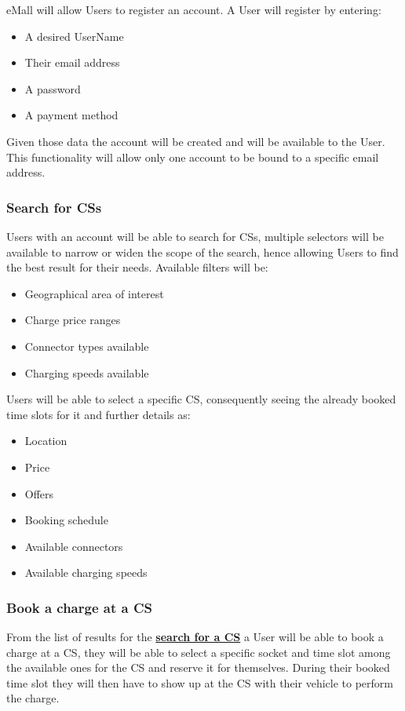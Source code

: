 \documentclass[11pt]{article}
\begin{document}
eMall will allow Users to register an account. A User will register by entering:
\begin{itemize}
    \item A desired UserName
    \item Their email address
    \item A password
    \item A payment method
\end{itemize}
Given those data the account will be created and will be available to the User. This functionality will allow only one account to be bound to a specific email address.

\subsubsection{Search for CSs}
\label{subsubsection:searchForCS}

Users with an account will be able to search for CSs, multiple selectors will be available to narrow or widen the scope of the search, hence allowing Users to find the best result for their needs. Available filters will be:
\begin{itemize}
    \item Geographical area of interest
    \item Charge price ranges
    \item Connector types available
    \item Charging speeds available
\end{itemize}
Users will be able to select a specific CS, consequently seeing the already booked time slots for it and further details as:
\begin{itemize}
    \item Location
    \item Price
    \item Offers
    \item Booking schedule
    \item Available connectors
    \item Available charging speeds
\end{itemize}

\subsubsection{Book a charge at a CS}

From the list of results for the \hyperref[subsubsection:searchForCS]{\textbf{search for a CS}} a User will be able to book a charge at a CS, they will be able to select a specific socket and time slot among the available ones for the CS and reserve it for themselves. During their booked time slot they will then have to show up at the CS with their vehicle to perform the charge.
\end{document}
